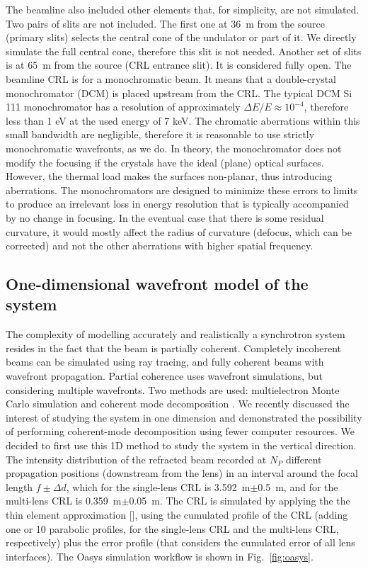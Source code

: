\documentclass[preprint]{iucr}
\newcommand{\inred}[1]{{\color{red}#1}}
\begin{document}
 \inred{The beamline also included other elements that, for simplicity, are not simulated. Two pairs of slits are not included. The first one at \SI{36}{\meter} from the source (primary slits) selects the central cone of the undulator or part of it. We directly simulate the full central cone, therefore this slit is not needed. Another set of slits is at \SI{65}{\meter} from the source (CRL entrance slit). It is considered fully open.
 The beamline CRL is for a monochromatic beam. It means that a double-crystal monochromator (DCM) is placed upstream from the CRL.
 The typical DCM Si 111 monochromator has a resolution of approximately $\Delta E/E \approx 10^{-4}$, therefore less than 1 eV at the used energy of 7 keV. The chromatic aberrations within this small bandwidth are negligible, therefore it is reasonable to use strictly monochromatic wavefronts, as we do. In theory, the monochromator does not modify the focusing if the crystals have the ideal (plane) optical surfaces. However, the thermal load makes the surfaces non-planar, thus introducing aberrations. The monochromators are designed to minimize these errors to limits to produce an irrelevant loss in energy resolution that is typically accompanied by no change in focusing. In the eventual case that there is some residual curvature, it would mostly affect the radius of curvature (defocus, which can be corrected) and not the other aberrations with higher spatial frequency.
 }

\subsection{One-dimensional wavefront model of the system}\label{sec:1Dmodel}
The complexity of modelling accurately and realistically a synchrotron system resides in the fact that the beam is partially coherent. Completely incoherent beams can be simulated using ray tracing, and fully coherent beams with wavefront propagation. Partial coherence uses wavefront simulations, but considering multiple wavefronts. Two methods are used: multielectron Monte Carlo simulation \cite{codeSRW_ME} and coherent mode decomposition \cite{Glass2017}. We recently discussed the interest of studying the system in one dimension and demonstrated the possibility of performing coherent-mode decomposition \cite{multioptics}  using fewer computer resources. We decided to first use this 1D method to study the system in the vertical direction. 
The intensity distribution of the refracted beam recorded at $N_P$ different propagation positions (downstream from the lens) in an interval around the focal length $f\pm\Delta d$, which for the single-lens CRL is \SI{3.592}{\meter}$\pm$\SI{0.5}{\meter}, and for the multi-lens CRL is \SI{0.359}{\meter}$\pm$\SI{0.05}{\meter}.
The CRL is simulated by applying the the thin element approximation \inred{[\cite{Celestre2020, multioptics}]}, using the cumulated profile of the CRL (adding one or 10 parabolic profiles, for the single-lens CRL and the multi-lens CRL, respectively) plus the error profile (that considers the cumulated error of all lens interfaces).
The Oasys \cite{codeOASYS} simulation workflow is shown in Fig.~\ref{fig:oasys}. 
\end{document}

